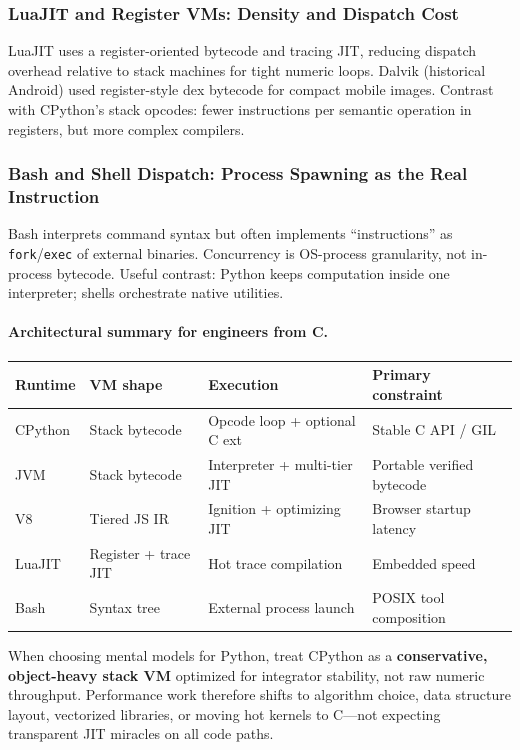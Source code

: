 \subsubsection{LuaJIT and Register VMs: Density and Dispatch Cost}

LuaJIT uses a register-oriented bytecode and tracing JIT, reducing dispatch overhead relative to stack machines for tight numeric loops. Dalvik (historical Android) used register-style dex bytecode for compact mobile images. Contrast with CPython's stack opcodes: fewer instructions per semantic operation in registers, but more complex compilers.

\subsubsection{Bash and Shell Dispatch: Process Spawning as the Real Instruction}

Bash interprets command syntax but often implements ``instructions'' as \texttt{fork}/\texttt{exec} of external binaries. Concurrency is OS-process granularity, not in-process bytecode. Useful contrast: Python keeps computation inside one interpreter; shells orchestrate native utilities.

\paragraph{Architectural summary for engineers from C.}
\begin{center}
\begin{tabular}{|l|l|l|l|}
\hline
\textbf{Runtime} & \textbf{VM shape} & \textbf{Execution} & \textbf{Primary constraint} \\
\hline
CPython & Stack bytecode & Opcode loop + optional C ext & Stable C API / GIL \\
JVM & Stack bytecode & Interpreter + multi-tier JIT & Portable verified bytecode \\
V8 & Tiered JS IR & Ignition + optimizing JIT & Browser startup latency \\
LuaJIT & Register + trace JIT & Hot trace compilation & Embedded speed \\
Bash & Syntax tree & External process launch & POSIX tool composition \\
\hline
\end{tabular}
\end{center}

When choosing mental models for Python, treat CPython as a \textbf{conservative, object-heavy stack VM} optimized for integrator stability, not raw numeric throughput. Performance work therefore shifts to algorithm choice, data structure layout, vectorized libraries, or moving hot kernels to C---not expecting transparent JIT miracles on all code paths.
